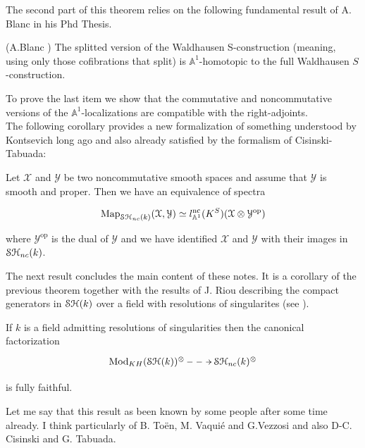\begin{refsection}
The second part of this theorem relies on the following fundamental result of A. Blanc in his Phd Thesis.

\begin{prop}(A.Blanc \cite[Prop. 4.6]{Anthony-thesis})
The splitted version of the Waldhausen S-construction (meaning, using only those cofibrations that split) is $\mathbb{A}^1$-homotopic to the full Waldhausen $S$-construction.
\end{prop}

To prove the last item we show that the commutative and noncommutative versions of the $\mathbb{A}^1$-localizations are compatible with the right-adjoints.\\

The following corollary provides a new formalization of something understood by Kontsevich \cite{kontsevich1, kontsevich2} long ago and also already satisfied by the formalism of Cisinski-Tabuada:

\begin{cor}
Let $\mathcal X$ and $\mathcal Y$ be two noncommutative smooth spaces and assume that $\mathcal Y$ is smooth and proper. Then we have an equivalence of spectra

$$
\mathrm{Map}_{\mathcal{S}\mathcal{H}_{nc}(k)}(\mathcal X, \mathcal Y)\simeq l_{\mathbb{A}^1}^\mathrm{nc}(K^S)(\mathcal X\otimes \mathcal Y^\mathrm{op})
$$

\noindent where $\mathcal Y^\mathrm{op}$ is the dual of $\mathcal Y$ and we have identified $\mathcal X$ and $\mathcal Y$ with their images in $\mathcal{S}\mathcal{H}_{nc}(k)$.
\end{cor}


The next result concludes the main content of these notes. It is a corollary of the previous theorem together with the results of J. Riou describing the compact generators in $\mathcal{S}\mathcal{H}(k)$ over a field with resolutions of singularites (see \cite{Riou-SHcompact}).




\begin{cor}
If $k$ is a field admitting resolutions of singularities then the canonical factorization 
$$\xymatrix{\mathrm{Mod}_{KH}(\stk)^{\otimes}\ar@{-->}[r]& \stncmonoidalk}$$

 \noindent is fully faithful.
\end{cor}

Let me say that this result as been known by some people after some time already. I think particularly of B. To\"en, M. Vaqui\'e and G.Vezzosi and also D-C. Cisinski and G. Tabuada.


\end{refsection}
